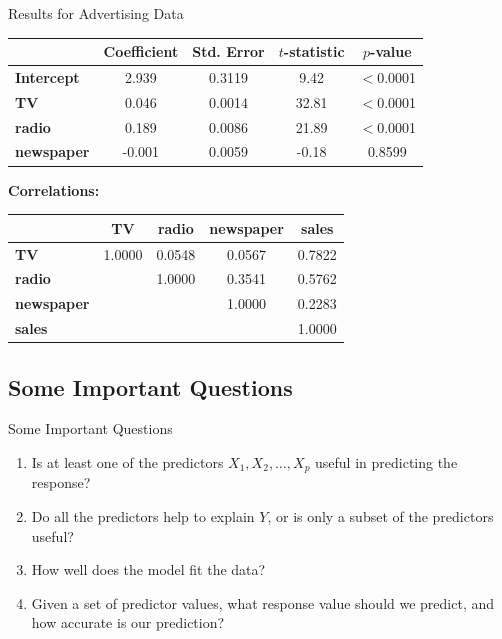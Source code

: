 \documentclass[aspectratio=169, 11pt]{beamer}
\begin{document}
\begin{frame}{Results for Advertising Data}
  \begin{table}
    \centering
    \begin{tabular}{l c c c c}
      \toprule
      & \textbf{Coefficient} & \textbf{Std. Error} & \textbf{$t$-statistic} & \textbf{$p$-value} \\
      \midrule
      \textbf{Intercept} & 2.939  & 0.3119 & 9.42   & $<$0.0001 \\
      \textbf{TV}        & 0.046  & 0.0014 & 32.81  & $<$0.0001 \\
      \textbf{radio}     & 0.189  & 0.0086 & 21.89  & $<$0.0001 \\
      \textbf{newspaper}& -0.001 & 0.0059 & -0.18  & 0.8599  \\
      \bottomrule
    \end{tabular}
  \end{table}

  \vspace{0.2cm}
  \textbf{Correlations:}
  \begin{table}
    \centering
    \small
    \begin{tabular}{l c c c c}
      \toprule
      & \textbf{TV} & \textbf{radio} & \textbf{newspaper} & \textbf{sales} \\
      \midrule
      \textbf{TV}        & 1.0000 & 0.0548 & 0.0567 & 0.7822 \\
      \textbf{radio}     &        & 1.0000 & 0.3541 & 0.5762 \\
      \textbf{newspaper} &        &        & 1.0000 & 0.2283 \\
      \textbf{sales}     &        &        &        & 1.0000 \\
      \bottomrule
    \end{tabular}
  \end{table}
\end{frame}

\subsection{Some Important Questions}

\begin{frame}{Some Important Questions}
  \begin{enumerate}
    \item Is at least one of the predictors $X_1, X_2, \dots, X_p$ useful in predicting the response? \pause
    \item Do all the predictors help to explain $Y$, or is only a subset of the predictors useful? \pause
    \item How well does the model fit the data? \pause
    \item Given a set of predictor values, what response value should we predict, and how accurate is our prediction? \pause
  \end{enumerate}
\end{frame}
\end{document}
